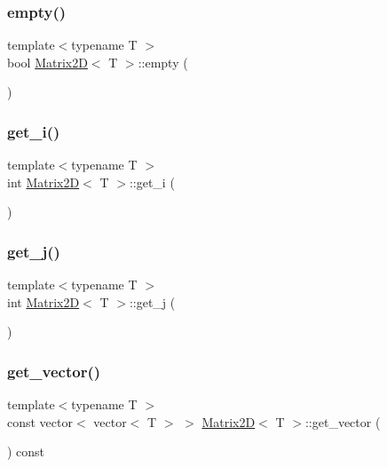 \mbox{\label{classMatrix2D_a5fd8ff857d4554c8fed6ca1ca2f1e87d}} 
\subsubsection{\texorpdfstring{empty()}{empty()}}
{\footnotesize\ttfamily template$<$typename T $>$ \\
bool \mbox{\hyperlink{classMatrix2D}{Matrix2D}}$<$ T $>$\+::empty (\begin{DoxyParamCaption}{ }\end{DoxyParamCaption})}

\mbox{\label{classMatrix2D_a9d44e60eef0274c20ed9bd1f597c89eb}} 
\subsubsection{\texorpdfstring{get\+\_\+i()}{get\_i()}}
{\footnotesize\ttfamily template$<$typename T $>$ \\
int \mbox{\hyperlink{classMatrix2D}{Matrix2D}}$<$ T $>$\+::get\+\_\+i (\begin{DoxyParamCaption}{ }\end{DoxyParamCaption})}

\mbox{\label{classMatrix2D_a30918dfce713408a9b3188bea33dbb57}} 
\subsubsection{\texorpdfstring{get\+\_\+j()}{get\_j()}}
{\footnotesize\ttfamily template$<$typename T $>$ \\
int \mbox{\hyperlink{classMatrix2D}{Matrix2D}}$<$ T $>$\+::get\+\_\+j (\begin{DoxyParamCaption}{ }\end{DoxyParamCaption})}

\mbox{\label{classMatrix2D_a2cd319270ca890e47dad636b9af34a11}} 
\subsubsection{\texorpdfstring{get\+\_\+vector()}{get\_vector()}}
{\footnotesize\ttfamily template$<$typename T $>$ \\
const vector$<$ vector$<$ T $>$ $>$ \mbox{\hyperlink{classMatrix2D}{Matrix2D}}$<$ T $>$\+::get\+\_\+vector (\begin{DoxyParamCaption}{ }\end{DoxyParamCaption}) const}

